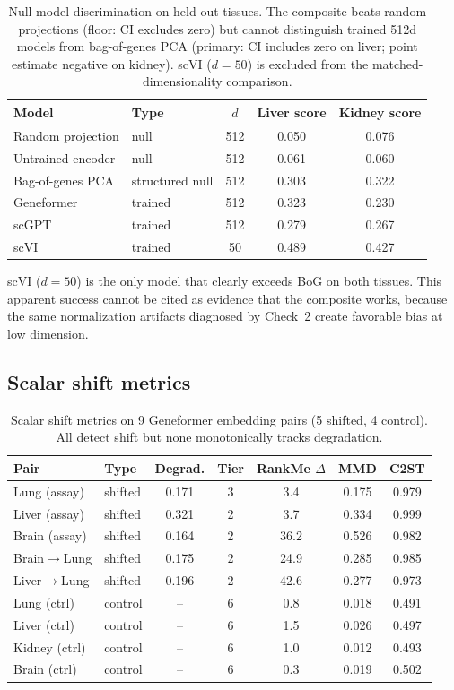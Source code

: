 \documentclass[10pt,letterpaper]{article}
\begin{document}
\begin{table}[h!]
\centering
\caption{Null-model discrimination on held-out tissues. The composite beats random projections (floor: CI excludes zero) but cannot distinguish trained 512d models from bag-of-genes PCA (primary: CI includes zero on liver; point estimate negative on kidney). scVI ($d = 50$) is excluded from the matched-dimensionality comparison.}
\label{tab:v6b}
\small
\begin{tabular}{@{}llccc@{}}
\toprule
Model & Type & $d$ & Liver score & Kidney score \\
\midrule
Random projection & null & 512 & 0.050 & 0.076 \\
Untrained encoder & null & 512 & 0.061 & 0.060 \\
\midrule
Bag-of-genes PCA & structured null & 512 & 0.303 & 0.322 \\
\midrule
Geneformer & trained & 512 & 0.323 & 0.230 \\
scGPT & trained & 512 & 0.279 & 0.267 \\
scVI & trained & 50 & 0.489 & 0.427 \\
\bottomrule
\end{tabular}
\end{table}

scVI ($d = 50$) is the only model that clearly exceeds BoG on both tissues. This apparent success cannot be cited as evidence that the composite works, because the same normalization artifacts diagnosed by Check~2 create favorable bias at low dimension.

\subsection{Scalar shift metrics}
\label{app:scalar}

\begin{table}[h!]
\centering
\caption{Scalar shift metrics on 9 Geneformer embedding pairs (5 shifted, 4 control). All detect shift but none monotonically tracks degradation.}
\label{tab:scalar}
\small
\begin{tabular}{@{}llccccc@{}}
\toprule
Pair & Type & Degrad. & Tier & RankMe $\Delta$ & MMD & C2ST \\
\midrule
Lung (assay)  & shifted & 0.171 & 3 & 3.4  & 0.175 & 0.979 \\
Liver (assay) & shifted & 0.321 & 2 & 3.7  & 0.334 & 0.999 \\
Brain (assay) & shifted & 0.164 & 2 & 36.2 & 0.526 & 0.982 \\
Brain$\to$Lung  & shifted & 0.175 & 2 & 24.9 & 0.285 & 0.985 \\
Liver$\to$Lung  & shifted & 0.196 & 2 & 42.6 & 0.277 & 0.973 \\
\midrule
Lung (ctrl)   & control & -- & 6 & 0.8 & 0.018 & 0.491 \\
Liver (ctrl)  & control & -- & 6 & 1.5 & 0.026 & 0.497 \\
Kidney (ctrl) & control & -- & 6 & 1.0 & 0.012 & 0.493 \\
Brain (ctrl)  & control & -- & 6 & 0.3 & 0.019 & 0.502 \\
\bottomrule
\end{tabular}
\end{table}
\end{document}
